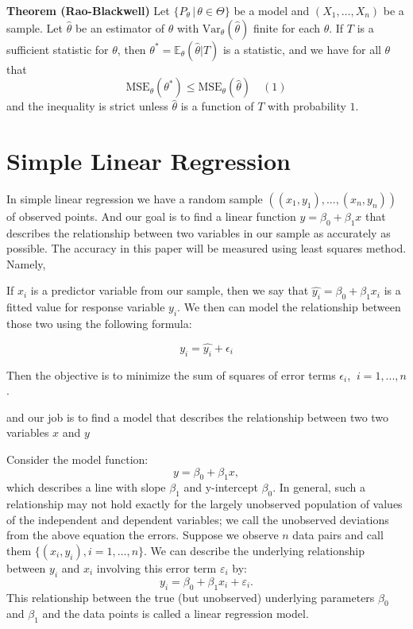 \documentclass[12pt,a4paper,oneside]{book} %
\begin{document}
\textbf{Theorem (Rao-Blackwell)} Let $\{P_{\theta} \,|\, \theta \in \Theta\}$ be a model and $(X_1, \ldots, X_n)$ be a sample. Let $\hat{\theta}$ be an estimator of $\theta$ with $\text{Var}_{\theta}(\hat{\theta})$ finite for each $\theta$. If $T$ is a sufficient statistic for $\theta$, then $\theta^* = \mathbb{E}_{\theta}(\hat{\theta} | T)$ is a statistic, and we have for all $\theta$ that
\[ \text{MSE}_{\theta}(\theta^*) \leq \text{MSE}_{\theta}(\hat{\theta}) \quad (1) \]
and the inequality is strict unless $\hat{\theta}$ is a function of $T$ with probability $1$.





	\clearpage
	
	\section{Simple Linear Regression}

In simple linear regression we have a random sample $((x_1,y_1),...,(x_n,y_n))$ of observed points. And our goal is to find a linear function $y=\beta_0 + \beta_1x$ that describes the relationship between two variables in our sample as accurately as possible. The accuracy in this paper will be measured using least squares method. Namely,

If $x_i$ is a predictor variable from our sample, then we say that $\hat{y_i}=\beta_0+\beta_1x_i$ is a fitted  value for response variable $y_i$. We then can model the relationship between those two using the following formula:

\[
	y_i = \hat{y_i} + \epsilon_i 	
\]

Then the objective is to minimize the sum of squares of error terms $\epsilon_i$, $\ i=1,...,n$.


and our job is to find a model that describes the relationship between two two variables $x$ and $y$
 




Consider the model function:
\[
y = \beta_0 + \beta_1 x,
\]
which describes a line with slope $\beta_1$ and y-intercept $\beta_0$. In general, such a relationship may not hold exactly for the largely unobserved population of values of the independent and dependent variables; we call the unobserved deviations from the above equation the errors. Suppose we observe $n$ data pairs and call them $\{(x_i, y_i), i = 1, \ldots, n\}$. We can describe the underlying relationship between $y_i$ and $x_i$ involving this error term $\varepsilon_i$ by:
\[
y_i = \beta_0 + \beta_1 x_i + \varepsilon_i.
\]
This relationship between the true (but unobserved) underlying parameters $\beta_0$ and $\beta_1$ and the data points is called a linear regression model.
\end{document}
